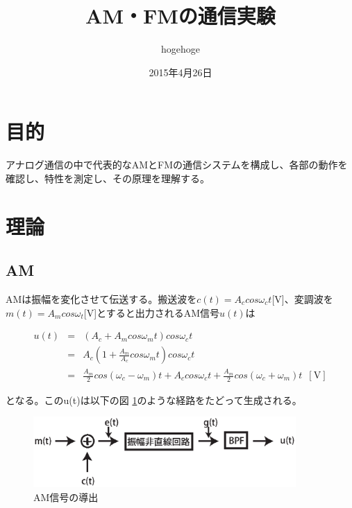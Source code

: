 \documentclass[11pt,a4j]{jsarticle}
\begin{document}
\title{AM・FMの通信実験}
\author{hogehoge}
\date{2015年4月26日}
\maketitle

\section{目的}

アナログ通信の中で代表的なAMとFMの通信システムを構成し、各部の動作を確認し、特性を測定し、その原理を理解する。

\section{理論}

\subsection{AM}
\label{sec:am}
AMは振幅を変化させて伝送する。搬送波を$c(t)=A_{c}cos\omega_{c}t$[V]、変調波を$m(t)=A_{m}cos\omega_{t}$[V]とすると出力されるAM信号$u(t)$は

\begin{eqnarray}
u(t)  &=&(A_{c} + A_{m}cos\omega_{m} t ) cos \omega_{c} t  \\
       &=& A_{c} (1+ \frac{A_{m}}{A_{c}} cos \omega_{m} t ) cos \omega_{c} t \label{eq:hentyoudo}\\
       &=& \frac{A_m}{2} cos(\omega_c - \omega_m)t + A_c cos\omega_c t + \frac{A_m}{2} cos(\omega_c + \omega_m) t \,\,\, \mathrm{[V]} \label{eq:sokutaiha}
\end{eqnarray}

となる。このu(t)は以下の図 \ref{ammodel}のような経路をたどって生成される。
\begin{figure}[H]
\begin{center}
	\includegraphics[clip, width=100mm]{amam.eps}
	\caption{AM信号の導出}
	\label{ammodel}
\end{center}
\end{figure}
\end{document}
